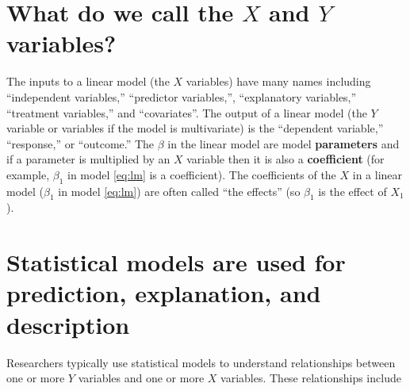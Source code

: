 \documentclass[]{book}
\begin{document}
\section{\texorpdfstring{What do we call the \(X\) and \(Y\)
variables?}{What do we call the X and Y variables?}}\label{what-do-we-call-the-x-and-y-variables}

The inputs to a linear model (the \(X\) variables) have many names
including ``independent variables,'' ``predictor variables,'',
``explanatory variables,'' ``treatment variables,'' and ``covariates''.
The output of a linear model (the \(Y\) variable or variables if the
model is multivariate) is the ``dependent variable,'' ``response,'' or
``outcome.'' The \(\beta\) in the linear model are model
\textbf{parameters} and if a parameter is multiplied by an \(X\)
variable then it is also a \textbf{coefficient} (for example,
\(\beta_1\) in model \eqref{eq:lm} is a coefficient). The coefficients of
the \(X\) in a linear model (\(\beta_1\) in model \eqref{eq:lm}) are often
called ``the effects'' (so \(\beta_1\) is the effect of \(X_1\)).

\section{Statistical models are used for prediction, explanation, and
description}\label{statistical-models-are-used-for-prediction-explanation-and-description}

Researchers typically use statistical models to understand relationships
between one or more \(Y\) variables and one or more \(X\) variables.
These relationships include
\end{document}
